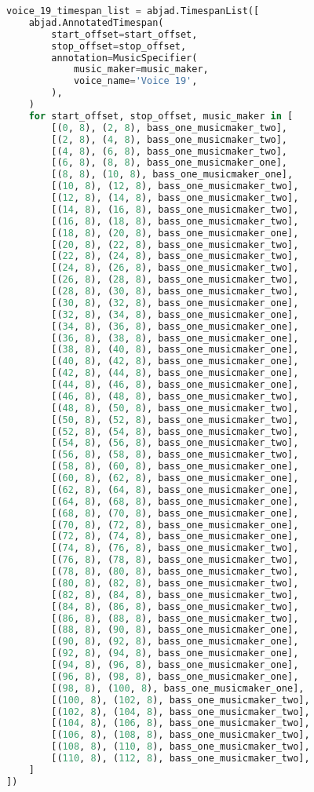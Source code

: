 \begin{lstlisting}[language=Python, caption=Invocation Source Code]
voice_19_timespan_list = abjad.TimespanList([
    abjad.AnnotatedTimespan(
        start_offset=start_offset,
        stop_offset=stop_offset,
        annotation=MusicSpecifier(
            music_maker=music_maker,
            voice_name='Voice 19',
        ),
    )
    for start_offset, stop_offset, music_maker in [
        [(0, 8), (2, 8), bass_one_musicmaker_two],
        [(2, 8), (4, 8), bass_one_musicmaker_two],
        [(4, 8), (6, 8), bass_one_musicmaker_two],
        [(6, 8), (8, 8), bass_one_musicmaker_one],
        [(8, 8), (10, 8), bass_one_musicmaker_one],
        [(10, 8), (12, 8), bass_one_musicmaker_two],
        [(12, 8), (14, 8), bass_one_musicmaker_two],
        [(14, 8), (16, 8), bass_one_musicmaker_two],
        [(16, 8), (18, 8), bass_one_musicmaker_two],
        [(18, 8), (20, 8), bass_one_musicmaker_one],
        [(20, 8), (22, 8), bass_one_musicmaker_two],
        [(22, 8), (24, 8), bass_one_musicmaker_two],
        [(24, 8), (26, 8), bass_one_musicmaker_two],
        [(26, 8), (28, 8), bass_one_musicmaker_two],
        [(28, 8), (30, 8), bass_one_musicmaker_two],
        [(30, 8), (32, 8), bass_one_musicmaker_one],
        [(32, 8), (34, 8), bass_one_musicmaker_one],
        [(34, 8), (36, 8), bass_one_musicmaker_one],
        [(36, 8), (38, 8), bass_one_musicmaker_one],
        [(38, 8), (40, 8), bass_one_musicmaker_one],
        [(40, 8), (42, 8), bass_one_musicmaker_one],
        [(42, 8), (44, 8), bass_one_musicmaker_one],
        [(44, 8), (46, 8), bass_one_musicmaker_one],
        [(46, 8), (48, 8), bass_one_musicmaker_two],
        [(48, 8), (50, 8), bass_one_musicmaker_two],
        [(50, 8), (52, 8), bass_one_musicmaker_two],
        [(52, 8), (54, 8), bass_one_musicmaker_two],
        [(54, 8), (56, 8), bass_one_musicmaker_two],
        [(56, 8), (58, 8), bass_one_musicmaker_two],
        [(58, 8), (60, 8), bass_one_musicmaker_one],
        [(60, 8), (62, 8), bass_one_musicmaker_one],
        [(62, 8), (64, 8), bass_one_musicmaker_one],
        [(64, 8), (68, 8), bass_one_musicmaker_one],
        [(68, 8), (70, 8), bass_one_musicmaker_one],
        [(70, 8), (72, 8), bass_one_musicmaker_one],
        [(72, 8), (74, 8), bass_one_musicmaker_one],
        [(74, 8), (76, 8), bass_one_musicmaker_two],
        [(76, 8), (78, 8), bass_one_musicmaker_two],
        [(78, 8), (80, 8), bass_one_musicmaker_two],
        [(80, 8), (82, 8), bass_one_musicmaker_two],
        [(82, 8), (84, 8), bass_one_musicmaker_two],
        [(84, 8), (86, 8), bass_one_musicmaker_two],
        [(86, 8), (88, 8), bass_one_musicmaker_two],
        [(88, 8), (90, 8), bass_one_musicmaker_one],
        [(90, 8), (92, 8), bass_one_musicmaker_one],
        [(92, 8), (94, 8), bass_one_musicmaker_one],
        [(94, 8), (96, 8), bass_one_musicmaker_one],
        [(96, 8), (98, 8), bass_one_musicmaker_one],
        [(98, 8), (100, 8), bass_one_musicmaker_one],
        [(100, 8), (102, 8), bass_one_musicmaker_two],
        [(102, 8), (104, 8), bass_one_musicmaker_two],
        [(104, 8), (106, 8), bass_one_musicmaker_two],
        [(106, 8), (108, 8), bass_one_musicmaker_two],
        [(108, 8), (110, 8), bass_one_musicmaker_two],
        [(110, 8), (112, 8), bass_one_musicmaker_two],
    ]
])


\end{lstlisting}
